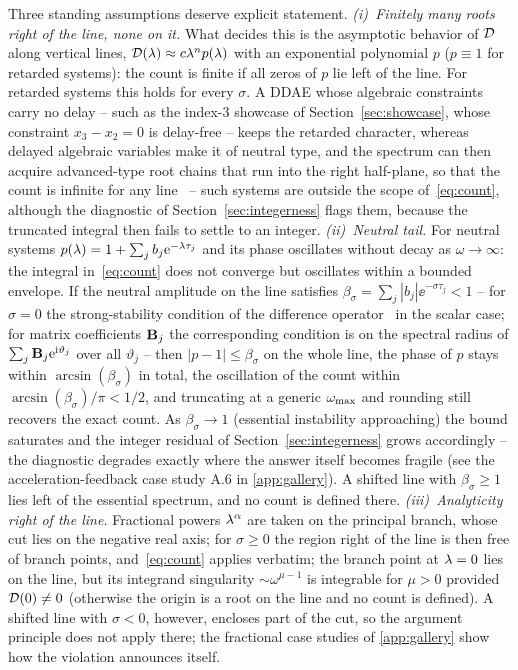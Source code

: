 Three standing assumptions deserve explicit statement. \emph{(i)~Finitely many
roots right of the line, none on it.} What decides this is the asymptotic
behavior of $\mathcal{D}$ along vertical lines, $\mathcal{D}(\lambda)\approx c\lambda^{n}p(\lambda)$
with an exponential polynomial $p$ ($p\equiv1$ for retarded systems): the
count is finite if all zeros of $p$ lie left of the line. For retarded
systems this holds for every $\sigma$. A DDAE whose algebraic constraints carry
no delay -- such as the index-3 showcase of Section~\ref{sec:showcase}, whose
constraint $x_3-x_2=0$ is delay-free -- keeps the retarded character, whereas
delayed algebraic variables make it of neutral type, and the spectrum can then
acquire advanced-type root chains that run into the right half-plane, so that
the count is infinite for any line~\cite{michiels2011spectrum,ha2016analysis}
-- such systems are outside the scope of~\eqref{eq:count}, although the
diagnostic of Section~\ref{sec:integerness} flags them, because the truncated
integral then fails to settle to an integer. \emph{(ii)~Neutral tail.} For
neutral systems $p(\lambda)=1+\sum_j b_j\mathrm{e}^{-\lambda\tau_j}$ and its phase
oscillates without decay as $\omega\to\infty$: the integral
in~\eqref{eq:count} does not converge but oscillates within a bounded
envelope. If the neutral amplitude on the line satisfies
$\beta_\sigma=\sum_j|b_j|\ee^{-\sigma\tau_j}<1$ -- for $\sigma=0$ the
strong-stability condition of the difference
operator~\cite{hale2002strong,michiels2005eigenvalue} in the scalar case; for
matrix coefficients $\mathbf{B}_j$ the corresponding condition is on the spectral
radius of $\sum_j\mathbf{B}_j\mathrm{e}^{\mathrm{i}\vartheta_j}$ over all $\vartheta_j$ -- then
$|p-1|\le\beta_\sigma$ on the whole line, the phase of $p$ stays within
$\arcsin(\beta_\sigma)$ in total, the oscillation of the count within
$\arcsin(\beta_\sigma)/\pi<1/2$, and truncating at a generic $\omega_{\mathrm{max}}$ and
rounding still recovers the exact count. As $\beta_\sigma\to1$ (essential
instability approaching) the bound saturates and the integer residual of
Section~\ref{sec:integerness} grows accordingly -- the diagnostic degrades
exactly where the answer itself becomes fragile (see the acceleration-feedback
case study A.6 in \ref{app:gallery}). A shifted line with
$\beta_\sigma\ge1$ lies left of the essential spectrum, and no count is
defined there. \emph{(iii)~Analyticity right of the line.} Fractional
powers $\lambda^{\alpha}$ are taken on the principal branch, whose cut lies on
the negative real axis; for $\sigma\ge0$ the region right of the line is then
free of branch points, and~\eqref{eq:count} applies verbatim; the branch
point at $\lambda=0$ lies on the line, but its integrand singularity
$\sim\omega^{\mu-1}$ is integrable for $\mu>0$ provided $\mathcal{D}(0)\neq0$
(otherwise the origin is a root on the line and no count is defined). A
shifted line with $\sigma<0$, however, encloses part of the cut, so the
argument principle does not apply there; the fractional case studies of
\ref{app:gallery} show how the violation announces itself.

